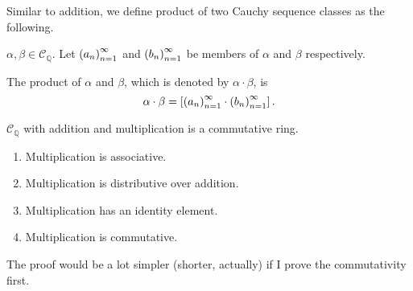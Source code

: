 Similar to addition, we define product of two Cauchy sequence classes as the following.

\begin{definition}
    $\alpha, \beta\in\mathscr{C}_{\mathbb{Q}}$. Let ${\left({a_{n}}\right)}^{\infty}_{n=1}$ and ${\left({b_{n}}\right)}^{\infty}_{n=1}$ be members of $\alpha$ and $\beta$ respectively.

    The product of $\alpha$ and $\beta$, which is denoted by $\alpha\cdot\beta$, is
    \[
        \alpha\cdot\beta = \left[{{\left({a_{n}}\right)}^{\infty}_{n=1}\cdot{\left({b_{n}}\right)}^{\infty}_{n=1}}\right].
    \]
\end{definition}

\begin{theorem}
    $\mathscr{C}_{\mathbb{Q}}$ with addition and multiplication is a commutative ring.
    \begin{enumerate}[label={(F\arabic*)},itemsep=0pt,start=5]
        \item Multiplication is associative.
        \item Multiplication is distributive over addition.
        \item Multiplication has an identity element.
        \item Multiplication is commutative.
    \end{enumerate}
\end{theorem}

The proof would be a lot simpler (shorter, actually) if I prove the commutativity first.

